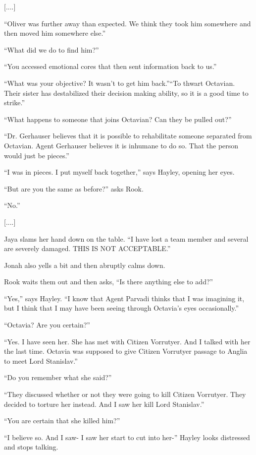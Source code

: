{[}....{]}

``Oliver was further away than expected.  We think they took him somewhere and then moved him somewhere else.''

``What did we do to find him?''

``You accessed emotional cores that then sent information back to us.''

``What was your objective?  It wasn't to get him back.''``To thwart Octavian.  Their sister has destabilized their decision making ability, so it is a good time to strike.''

``What happens to someone that joins Octavian?  Can they be pulled out?''

``Dr. Gerhauser believes that it is possible to rehabilitate someone separated from Octavian.  Agent Gerhauser believes it is inhumane to do so.  That the person would just be pieces.''

``I was in pieces.  I put myself back together,'' says Hayley, opening her eyes.

``But are you the same as before?'' asks Rook.

``No.''

{[}....{]}

Jaya slams her hand down on the table.  ``I have lost a team member and several are severely damaged.  THIS IS NOT ACCEPTABLE.''

Jonah also yells a bit and then abruptly calms down.



Rook waits them out and then asks, ``Is there anything else to add?''

``Yes,'' says Hayley.  ``I know that Agent Parvadi thinks that I was imagining it, but I think that I may have been seeing through Octavia's eyes occasionally.''

``Octavia?  Are you certain?''

``Yes.  I have seen her.  She has met with Citizen Vorrutyer.  And I talked with her the last time.  Octavia was supposed to give Citizen Vorrutyer passage to Anglia to meet Lord Stanislav.''

``Do you remember what she said?''

``They discussed whether or not they were going to kill Citizen Vorrutyer.  They decided to torture her instead.  And I saw her kill Lord Stanislav.''

``You are certain that she killed him?''

``I believe so.  And I saw- I saw her start to cut into her-'' Hayley looks distressed and stops talking. 

